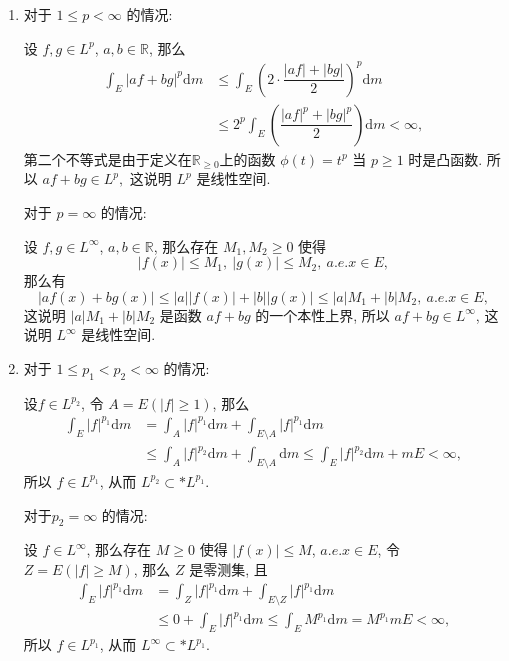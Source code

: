 \begin{solution}
\begin{enumerate}
\item 对于 \(1 \leqslant p < \infty\) 的情况: 

设 \(f, g \in L^p\), \(a, b \in \mathbb{R}\), 那么
\[\begin{aligned}
\int_E \lvert af + bg \rvert^p \mathrm{d} m & \leqslant \int_E \left( 2 \cdot \dfrac{\lvert af \rvert + \lvert bg \rvert}{2} \right)^p \mathrm{d} m \\
& \leqslant 2^p \int_E \left( \dfrac{\lvert af \rvert^p + \lvert bg \rvert^p}{2} \right) \mathrm{d} m < \infty,
\end{aligned}\]
第二个不等式是由于定义在\(\mathbb{R}_{\geqslant 0}\)上的函数 \(\phi(t) = t^p\) 当 \(p \geqslant 1\) 时是凸函数. 所以 \(af + bg \in L^p,\) 这说明 \(L^p\) 是线性空间.

对于 \(p = \infty\) 的情况: 

设 \(f, g \in L^\infty\), \(a, b \in \mathbb{R}\), 那么存在 \(M_1, M_2 \geqslant 0\) 使得
\[\lvert f(x) \rvert \leqslant M_1, ~ \lvert g(x) \rvert \leqslant M_2, ~ a.e. x \in E,\]
那么有
\[\lvert af(x) + bg(x) \rvert \leqslant \lvert a \rvert \lvert f(x) \rvert + \lvert b \rvert \lvert g(x) \rvert \leqslant \lvert a \rvert M_1 + \lvert b \rvert M_2, ~ a.e. x \in E,\]
这说明 \(\lvert a \rvert M_1 + \lvert b \rvert M_2\) 是函数 \(af + bg\) 的一个本性上界, 所以 \(af + bg \in L^\infty\), 这说明 \(L^\infty\) 是线性空间.
\item 对于 \(1 \leqslant p_1 < p_2 < \infty\) 的情况: 

设\(f \in L^{p_2}\), 令 \(A = E(\lvert f \rvert \geqslant 1)\), 那么
\[\begin{aligned}
\int_E \lvert f \rvert^{p_1} \mathrm{d} m & = \int_A \lvert f \rvert^{p_1} \mathrm{d} m + \int_{E \setminus A} \lvert f \rvert^{p_1} \mathrm{d} m \\
& \leqslant \int_A \lvert f \rvert^{p_2} \mathrm{d} m + \int_{E \setminus A} \mathrm{d} m \leqslant \int_E \lvert f \rvert^{p_2} \mathrm{d} m + m E < \infty,
\end{aligned}\]
所以 \(f \in L^{p_1}\), 从而 \(L^{p_2} \subset* L^{p_1}\).

对于\(p_2 = \infty\) 的情况: 

设 \(f \in L^\infty\), 那么存在 \(M \geqslant 0\) 使得 \(\lvert f(x) \rvert \leqslant M\), \(a.e. x \in E\), 令 \(Z = E(\lvert f \rvert \geqslant M)\), 那么 \(Z\) 是零测集, 且
\[\begin{aligned}
\int_E \lvert f \rvert^{p_1} \mathrm{d} m & = \int_Z \lvert f \rvert^{p_1} \mathrm{d} m + \int_{E \setminus Z} \lvert f \rvert^{p_1} \mathrm{d} m \\
& \leqslant 0 + \int_E \lvert f \rvert^{p_1} \mathrm{d} m \leqslant \int_E M^{p_1} \mathrm{d} m = M^{p_1} m E < \infty,
\end{aligned}\]
所以 \(f \in L^{p_1}\), 从而 \(L^\infty \subset* L^{p_1}\).
\end{enumerate}
\end{solution}

